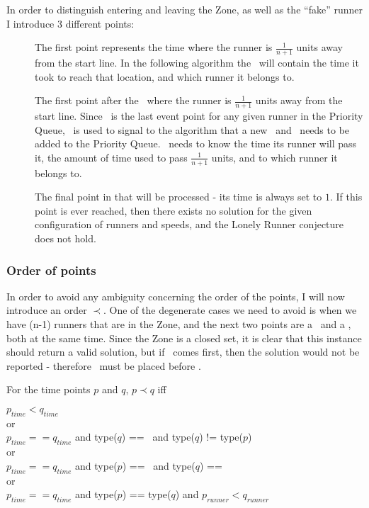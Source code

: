 In order to distinguish entering and leaving the Zone, as well as the ``fake'' runner I introduce 3 different points:
\begin{description}
\item[\comStart] The first point represents the time where the runner is $\frac{1}{n + 1}$ units away from the start line. In the following algorithm the \comStart\, will contain the time it took to reach that location, and which runner it belongs to.
\item[\comEnd] The first point after the \comStart\, where the runner is $\frac{1}{n + 1}$ units away from the start line. Since \comEnd\, is the last event point for any given runner in the Priority Queue, \comEnd\, is used to signal to the algorithm that a new \comStart\, and \comEnd\, needs to be added to the Priority Queue. \comEnd\, needs to know the time its runner will pass it, the amount of time used to pass $\frac{1}{n+1}$ units, and to which runner it belongs to.
\item[\comFin] The final point in that will be processed - its time is always set to $1$. If this point is ever reached, then there exists no solution for the given configuration of runners and speeds, and the Lonely Runner conjecture does not hold.
\end{description}

\subsubsection{Order of points}
In order to avoid any ambiguity concerning the order of the points, I will now introduce an order $\prec$. One of the degenerate cases we need to avoid is when we have (n-1) runners that are in the Zone, and the next two points are a \comEnd\, and a \comStart, both at the same time. Since the Zone is a closed set, it is clear that this instance should return a valid solution, but if \comEnd\, comes first, then the solution would not be reported - therefore \comStart\, must be placed before \comEnd. 

For the time points $p$ and $q$, $p \prec q$ iff \\

\begin{center}
$p_{time} < q_{time}$\\
or \\
$p_{time} == q_{time}$ and type($q$) == \comFin\, and type($q$) != type($p$)\\
or \\
$p_{time} == q_{time}$ and type($p$) == \comStart\, and type($q$) == \comEnd \\
or \\
$p_{time} == q_{time}$ and type($p$) == type($q$) and $p_{runner} < q_{runner}$
\end{center}

